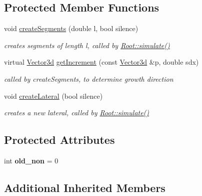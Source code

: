 \subsection*{Protected Member Functions}
\begin{DoxyCompactItemize}
\item 
void \hyperlink{classCPlantBox_1_1Root_ade05f972f0110970749e0cee9a29bd8c}{create\+Segments} (double l, bool silence)
\begin{DoxyCompactList}\small\item\em creates segments of length l, called by \hyperlink{classCPlantBox_1_1Root_af2fa9d229ab05897214e0ec224f0ae71}{Root\+::simulate()} \end{DoxyCompactList}\item 
\mbox{\label{classCPlantBox_1_1Root_a116746eecadec26edb328f620c7bbb1c}} 
virtual \hyperlink{classCPlantBox_1_1Vector3d}{Vector3d} \hyperlink{classCPlantBox_1_1Root_a116746eecadec26edb328f620c7bbb1c}{get\+Increment} (const \hyperlink{classCPlantBox_1_1Vector3d}{Vector3d} \&p, double sdx)
\begin{DoxyCompactList}\small\item\em called by create\+Segments, to determine growth direction \end{DoxyCompactList}\item 
void \hyperlink{classCPlantBox_1_1Root_a67997bf9a5ad9f38ea9b109e9d4ef253}{create\+Lateral} (bool silence)
\begin{DoxyCompactList}\small\item\em creates a new lateral, called by \hyperlink{classCPlantBox_1_1Root_af2fa9d229ab05897214e0ec224f0ae71}{Root\+::simulate()} \end{DoxyCompactList}\end{DoxyCompactItemize}
\subsection*{Protected Attributes}
\begin{DoxyCompactItemize}
\item 
\mbox{\label{classCPlantBox_1_1Root_ad30a8f260973de5bbe2c7a9458539559}} 
int {\bfseries old\+\_\+non} = 0
\end{DoxyCompactItemize}
\subsection*{Additional Inherited Members}



